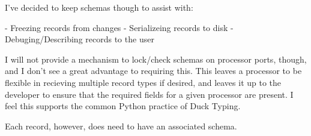 I've decided to keep schemas though to assist with\-: \begin{DoxyVerb}- Freezing records from changes
- Serializeing records to disk
- Debuging/Describing records to the user
\end{DoxyVerb}


I will not provide a mechanism to lock/check schemas on processor ports, though, and I don't see a great advantage to requiring this. This leaves a processor to be flexible in recieving multiple record types if desired, and leaves it up to the developer to ensure that the required fields for a given processor are present. I feel this supports the common Python practice of Duck Typing.

Each record, however, does need to have an associated schema. 